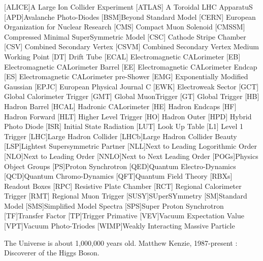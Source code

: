 \begin{acronym}[AAAAAAA]
[ALICE]{A Large Ion Collider Experiment}
 [ATLAS] {A Toroidal LHC ApparatuS}
[APD]{Avalanche Photo-Diodes}
[BSM]{Beyond Standard Model}
 [CERN] {European Organization for Nuclear Research}
 [CMS] {Compact Muon Solenoid}
 [CMSSM] {Compressed Minimal SuperSymmetric Model}
 [CSC] {Cathode Stripe Chamber}
 [CSV] {Combined Secondary Vertex}
 [CSVM] {Combined Secondary Vertex Medium Working Point}
 [DT] {Drift Tube}
 [ECAL] {Electromagnetic CALorimeter}
 [EB] {Electromagnetic CALorimeter Barrel}
 [EE] {Electromagnetic CALorimeter Endcap}
 [ES] {Electromagnetic CALorimeter pre-Shower}
 [EMG] {Exponentially Modified Gaussian}
 [EPJC] {European Physical Journal C}
 [EWK] {Electroweak Sector}
 [GCT] {Global Calorimeter Trigger}
 [GMT] {Global MuonTrigger}
 [GT] {Global Trigger}
 [HB] {Hadron Barrel}
 [HCAL] {Hadronic CALorimeter}
 [HE] {Hadron Endcaps}
 [HF] {Hadron Forward}
[HLT] {Higher Level Trigger}
 [HO] {Hadron Outer}
 [HPD] {Hybrid Photo Diode}
 [ISR] {Initial State Radiation}
 [LUT] {Look Up Table}
 [L1] {Level 1 Trigger}
[LHC]{Large Hadron Collider}
[LHCb]{Large Hadron Collider Beauty}
[LSP]{Lightest Supersymmetric Partner}
[NLL]{Next to Leading Logorithmic Order}
[NLO]{Next to Leading Order}
[NNLO]{Next to Next Leading Order}
[POGs]{Physics Object Groups}
[PS]{Proton Synchrotron}
[QED]{Quantum Electro-Dynamics}
[QCD]{Quantum Chromo-Dynamics}
[QFT]{Quantum Field Theory}
 [RBXs] {Readout Boxes}
 [RPC] {Resistive Plate Chamber}
 [RCT] {Regional Calorimeter Trigger}
 [RMT] {Regional Muon Trigger}
[SUSY]{SUperSYmmetry}
[SM]{Standard Model}
[SMS]{Simplified Model Spectra}
[SPS]{Super Proton Synchrotron}
[TF]{Transfer Factor}
[TP]{Trigger Primative}
[VEV]{Vacuum Expectation Value}
[VPT]{Vacuum Photo-Triodes}
[WIMP]{Weakly Interacting Massive Particle}

\end{acronym}

\frontquote%
  {The Universe is about 1,000,000 years old.}%
  {Matthew Kenzie, 1987-present : Discoverer of the Higgs Boson.}
